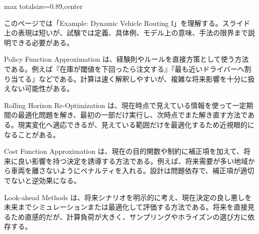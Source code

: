 \begin{minipage}[t]{0.58\textwidth}
\begin{adjustbox}{max totalsize={\textwidth}{0.89\textheight},center}
\begin{minipage}{\textwidth}\scriptsize
{}このページでは「Example: Dynamic Vehicle Routing I」を理解する。スライド上の表現は短いが、試験では定義、具体例、モデル上の意味、手法の限界まで説明できる必要がある。\par
Policy Function Approximation は、経験則やルールを直接方策として使う方法である。例えば『在庫が閾値を下回ったら注文する』『最も近いドライバーへ割り当てる』などである。計算は速く解釈しやすいが、複雑な将来影響を十分に扱えない可能性がある。\par
Rolling Horizon Re-Optimization は、現在時点で見えている情報を使って一定期間の最適化問題を解き、最初の一部だけ実行し、次時点でまた解き直す方法である。現実変化へ適応できるが、見えている範囲だけを最適化するため近視眼的になることがある。\par
Cost Function Approximation は、現在の目的関数や制約に補正項を加えて、将来に良い影響を持つ決定を誘導する方法である。例えば、将来需要が多い地域から車両を離さないようにペナルティを入れる。設計は問題依存で、補正項が適切でないと逆効果になる。\par
Look-ahead Methods は、将来シナリオを明示的に考え、現在決定の良し悪しを未来までシミュレーションまたは最適化して評価する方法である。将来を直接見るため直感的だが、計算負荷が大きく、サンプリングやホライズンの選び方に依存する。\par

\end{minipage}
\end{adjustbox}
\end{minipage}

